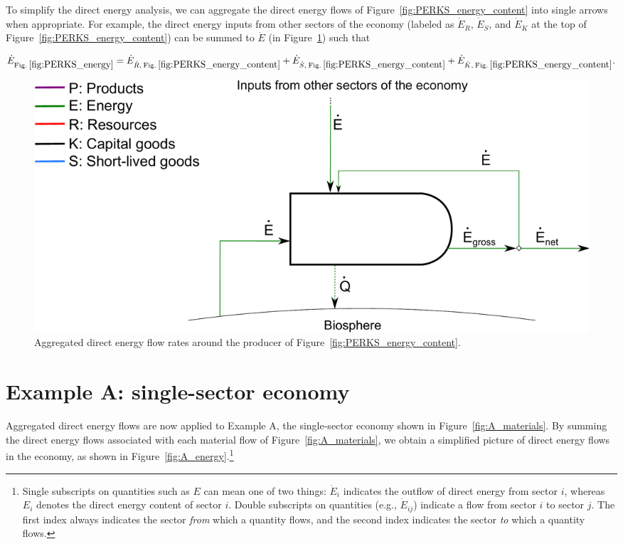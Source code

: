To simplify the direct energy analysis, 
we can aggregate the direct energy flows of Figure~\ref{fig:PERKS_energy_content}
into single arrows when appropriate. 
For example, the direct energy inputs from other sectors of the economy
(labeled as $\dot{E}_{\dot{R}}$, $\dot{E}_{\dot{S}}$, and $\dot{E}_{\dot{K}}$ 
at the top of Figure~\ref{fig:PERKS_energy_content}) can be summed to $\dot{E}$ 
(in Figure~\ref{fig:PERKS_energy}) such that

\begin{equation} \label{eq:direct_energy_aggregation}
	\dot{E}_{\mathrm{Fig. \: \ref{fig:PERKS_energy}}} 
	= \dot{E}_{\dot{R}, \: \mathrm{Fig. \: \ref{fig:PERKS_energy_content}}} 
	+ \dot{E}_{\dot{S}, \: \mathrm{Fig. \: \ref{fig:PERKS_energy_content}}} 
	+ \dot{E}_{\dot{K}, \: \mathrm{Fig. \: \ref{fig:PERKS_energy_content}}}.
\end{equation}

\begin{figure}[h!]
\centering
\includegraphics[width=0.8\linewidth]{Part_2/Chapter_Energy/images/PERKS_basic_unit_energy.pdf}
\caption{Aggregated direct energy flow rates around 
the producer of Figure~\ref{fig:PERKS_energy_content}.}
\label{fig:PERKS_energy}
\end{figure}


\section{Example A: single-sector economy}
\label{sec:A_energy}

Aggregated direct energy flows are now applied to Example A, 
the single-sector economy shown in Figure~\ref{fig:A_materials}.
By summing the direct energy flows associated with
each material flow of Figure~\ref{fig:A_materials}, we obtain
a simplified picture of direct energy flows in the economy,
as shown in Figure~\ref{fig:A_energy}.\footnote{Single 
subscripts on quantities such as
$E$ can mean one of two things: 
$\dot{E}_{i}$ indicates the outflow of direct energy from sector $i$, 
whereas $E_{i}$ denotes the direct energy content of sector $i$. 
Double subscripts on quantities
(e.g., $\dot{E}_{ij}$) indicate a flow 
from sector $i$ to sector $j$. 
The first index always indicates the sector \emph{from} which a quantity flows, 
and the second index indicates the sector \emph{to} which a quantity flows.}


